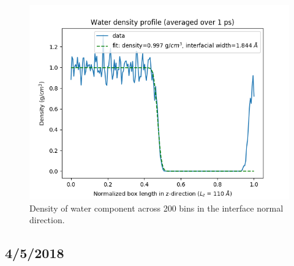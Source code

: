 \documentclass[12pt,reqno]{amsart}
\numberwithin{equation}{section}
\begin{document}
\begin{enumerate}
\begin{figure}[H]
\centering
\includegraphics[scale=0.4]{water_density_profile_fit}
\caption{Density of water component across 200 bins in the interface normal direction.}
\end{figure}

\end{enumerate}

\subsection{4/5/2018}
\end{document}
